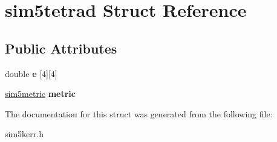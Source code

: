\hypertarget{structsim5tetrad}{}\section{sim5tetrad Struct Reference}
\label{structsim5tetrad}
\subsection*{Public Attributes}
\begin{DoxyCompactItemize}
\item 
\mbox{\label{structsim5tetrad_a1bf8f1be7f71cfda5d00c955f936edae}} 
double {\bfseries e} \mbox{[}4\mbox{]}\mbox{[}4\mbox{]}
\item 
\mbox{\label{structsim5tetrad_a41ccfd824350fc0b0696eadbe770fc56}} 
\hyperlink{structsim5metric}{sim5metric} {\bfseries metric}
\end{DoxyCompactItemize}


The documentation for this struct was generated from the following file\+:\begin{DoxyCompactItemize}
\item 
sim5kerr.\+h\end{DoxyCompactItemize}
